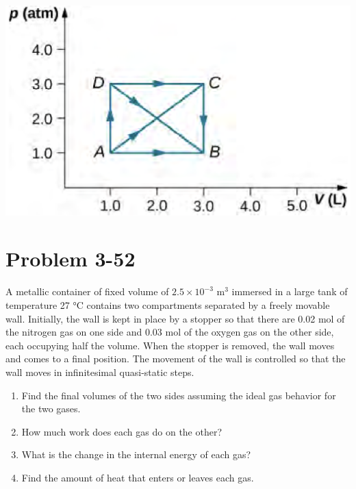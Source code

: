 \documentclass[11pt]{article}
\begin{document}
 \includegraphics[scale=0.35]{3-28.png}
 \newpage 

 \section*{Problem 3-52}
 A metallic container of fixed volume of \(2.5 \times 10^{-3}\) m\(^3\) immersed in a large tank 
 of temperature 27 °C contains two compartments separated by a freely movable wall. Initially, 
 the wall is kept in place by a stopper so that there are 0.02 mol of the nitrogen gas on one 
 side and 0.03 mol of the oxygen gas on the other side, each occupying half the volume. When the 
 stopper is removed, the wall moves and comes to a final position. The movement of the wall is 
 controlled so that the wall moves in infinitesimal quasi-static steps. 
 \begin{enumerate}[label=(\alph*)]
   \item Find the final volumes of the two sides assuming the ideal gas behavior for the two gases. 
   \item How much work does each gas do on the other? 
   \item What is the change in the internal energy of each gas? 
   \item Find the amount of heat that enters or leaves each gas.
 \end{enumerate}
\end{document}
